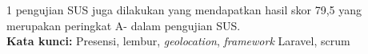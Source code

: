 \begin{spacing}{1}
pengujian SUS juga dilakukan yang mendapatkan hasil skor 79,5 yang merupakan peringkat A- dalam pengujian SUS.     
\\


 

\noindent\textbf{Kata kunci:} Presensi, lembur, \textit{geolocation}, \textit{framework} Laravel, scrum
\end{spacing}



